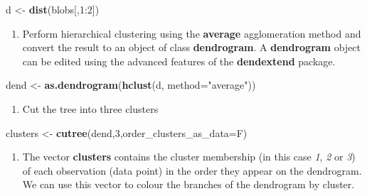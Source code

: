 \documentclass[]{book}
\newenvironment{Shaded}{\begin{snugshade}}{\end{snugshade}}
\newcommand{\KeywordTok}[1]{\textcolor[rgb]{0.13,0.29,0.53}{\textbf{{#1}}}}
\newcommand{\DataTypeTok}[1]{\textcolor[rgb]{0.13,0.29,0.53}{{#1}}}
\newcommand{\DecValTok}[1]{\textcolor[rgb]{0.00,0.00,0.81}{{#1}}}
\newcommand{\StringTok}[1]{\textcolor[rgb]{0.31,0.60,0.02}{{#1}}}
\newcommand{\NormalTok}[1]{{#1}}
\providecommand{\tightlist}{%
  \setlength{\itemsep}{0pt}\setlength{\parskip}{0pt}}
\theoremstyle{definition}
\theoremstyle{definition}
\theoremstyle{definition}
\theoremstyle{remark}
\begin{document}
\begin{Shaded}
\begin{Highlighting}[]
\NormalTok{d <-}\StringTok{ }\KeywordTok{dist}\NormalTok{(blobs[,}\DecValTok{1}\NormalTok{:}\DecValTok{2}\NormalTok{])}
\end{Highlighting}
\end{Shaded}

\begin{enumerate}
\def\labelenumi{\arabic{enumi}.}
\setcounter{enumi}{4}
\tightlist
\item
  Perform hierarchical clustering using the \textbf{average}
  agglomeration method and convert the result to an object of class
  \textbf{dendrogram}. A \textbf{dendrogram} object can be edited using
  the advanced features of the \textbf{dendextend} package.
\end{enumerate}

\begin{Shaded}
\begin{Highlighting}[]
\NormalTok{dend <-}\StringTok{ }\KeywordTok{as.dendrogram}\NormalTok{(}\KeywordTok{hclust}\NormalTok{(d, }\DataTypeTok{method=}\StringTok{"average"}\NormalTok{))}
\end{Highlighting}
\end{Shaded}

\begin{enumerate}
\def\labelenumi{\arabic{enumi}.}
\setcounter{enumi}{5}
\tightlist
\item
  Cut the tree into three clusters
\end{enumerate}

\begin{Shaded}
\begin{Highlighting}[]
\NormalTok{clusters <-}\StringTok{ }\KeywordTok{cutree}\NormalTok{(dend,}\DecValTok{3}\NormalTok{,}\DataTypeTok{order_clusters_as_data=}\NormalTok{F)}
\end{Highlighting}
\end{Shaded}

\begin{enumerate}
\def\labelenumi{\arabic{enumi}.}
\setcounter{enumi}{6}
\tightlist
\item
  The vector \textbf{clusters} contains the cluster membership (in this
  case \emph{1}, \emph{2} or \emph{3}) of each observation (data point)
  in the order they appear on the dendrogram. We can use this vector to
  colour the branches of the dendrogram by cluster.
\end{enumerate}
\end{document}
